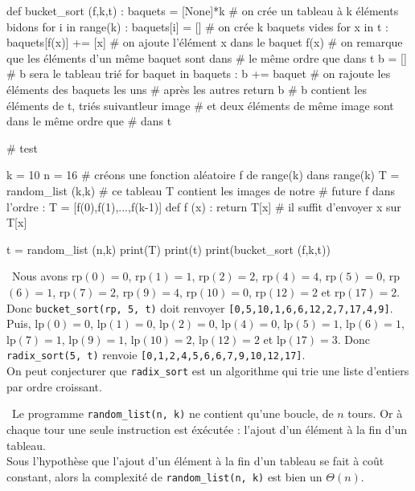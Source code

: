 \begin{python}

def bucket_sort (f,k,t) :
    baquets = [None]*k # on crée un tableau à k éléments bidons
    for i in range(k) :
        baquets[i] = [] # on crée k baquets vides
    for x in t :
        baquets[f(x)] += [x] # on ajoute l'élément x dans le baquet f(x)
                # on remarque que les éléments d'un même baquet sont dans
                # le même ordre que dans t
    b = [] # b sera le tableau trié
    for baquet in baquets :
        b += baquet # on rajoute les éléments des baquets les uns
                    # après les autres
    return b # b contient les éléments de t, triés suivantleur image
        # et deux éléments de même image sont dans le même ordre que
        # dans t

# test

k = 10
n = 16
# créons une fonction aléatoire f de range(k) dans range(k)
T = random_list (k,k) # ce tableau T contient les images de notre
    # future f dans l'ordre : T = [f(0),f(1),...,f(k-1)]
def f (x) :
    return T[x] # il suffit d'envoyer x sur T[x]

t = random_list (n,k)
print(T)
print(t)
print(bucket_sort (f,k,t))

\end{python}


\question\
Nous avons rp$(0)=0$, rp$(1)=1$, rp$(2)=2$, rp$(4)=4$, rp$(5)=0$, rp$(6)=1$, rp$(7)=2$, rp$(9)=4$, rp$(10)=0$, 
rp$(12)=2$ et rp$(17)=2$. Donc \texttt{bucket\_sort(rp, 5, t)} doit renvoyer \texttt{[0,5,10,1,6,6,12,2,7,17,4,9]}.\\
Puis, lp$(0)=0$, lp$(1)=0$, lp$(2)=0$, lp$(4)=0$, lp$(5)=1$, lp$(6)=1$, lp$(7)=1$, lp$(9)=1$, lp$(10)=2$, lp$(12)=2$ et 
lp$(17)=3$. Donc \texttt{radix\_sort(5, t)} renvoie \texttt{[0,1,2,4,5,6,6,7,9,10,12,17]}.\\
On peut conjecturer que \texttt{radix\_sort} est un algorithme qui trie une liste d'entiers par ordre croissant.



\question\ Le programme 
\verb|random_list(n, k)| ne contient qu'une boucle, de $n$ 
tours. Or à chaque tour une seule instruction est éxécutée : l'ajout d'un 
élément à la fin d'un tableau.\\
Sous l'hypothèse que l'ajout d'un élément à la fin d'un tableau se fait à 
coût constant, alors la complexité de \verb|random_list(n, k)| est bien un 
$\Theta(n)$.\\

